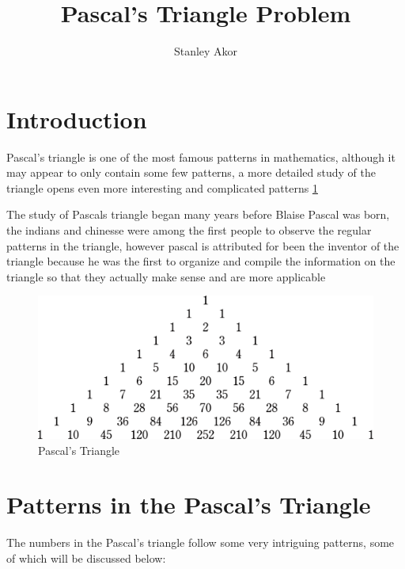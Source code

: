 \documentclass[10pt,a4paper]{article}
\author{Stanley Akor}
\title{Pascal's Triangle Problem}
\begin{document}
\maketitle
\tableofcontents

\newpage
\section{Introduction}
Pascal's triangle is one of the most famous patterns in mathematics, although it may appear to only contain some few patterns, a more detailed study of the triangle opens even more interesting and complicated patterns \ref{triangle}

The study of Pascals triangle began many years before Blaise Pascal was born, the indians and chinesse were among the first people to observe the regular patterns in the triangle, however pascal is attributed for  been the inventor of the triangle because he was the first to organize and compile the information on the triangle so that they actually make sense and are more applicable\cite{siep}

\begin{figure}[h!] \label{triangle}
	\centering
	\includegraphics[scale=0.2]{pascal}
	
\caption{Pascal's Triangle}
\end{figure}

\section{Patterns in the Pascal's Triangle}
The numbers in the Pascal's triangle follow some very intriguing patterns, some of which  will be discussed below: 
\end{document}
